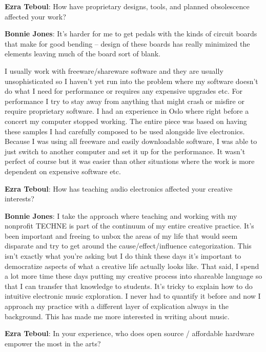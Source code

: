 \textbf{Ezra Teboul}: How have proprietary designs, tools, and planned obsolescence affected your work?

\textbf{Bonnie Jones}: It’s harder for me to get pedals with the kinds of circuit boards that make for good bending – design of these boards has really minimized the elements leaving much of the board sort of blank. 

I usually work with freeware/shareware software and they are usually unsophisticated so I haven’t yet run into the problem where my software doesn’t do what I need for performance or requires any expensive upgrades etc. For performance I try to stay away from anything that might crash or misfire or require proprietary software. I had an experience in Oslo where right before a concert my computer stopped working. The entire piece was based on having these samples I had carefully composed to be used alongside live electronics. Because I was using all freeware and easily downloadable software, I was able to just switch to another computer and set it up for the performance. It wasn’t perfect of course but it was easier than other situations where the work is more dependent on expensive software etc. 

\textbf{Ezra Teboul}: How has teaching audio electronics affected your creative interests?

\textbf{Bonnie Jones}: I take the approach where teaching and working with my nonprofit TECHNE is part of the continuum of my entire creative practice. It’s been important and freeing to unbox the areas of my life that would seem disparate and try to get around the cause/effect/influence categorization. This isn’t exactly what you’re asking but I do think these days it’s important to democratize aspects of what a creative life actually looks like. That said, I spend a lot more time these days putting my creative process into shareable language so that I can transfer that knowledge to students. It’s tricky to explain how to do intuitive electronic music exploration. I never had to quantify it before and now I approach my practice with a different layer of explication always in the background. This has made me more interested in writing about music. 

\textbf{Ezra Teboul}: In your experience, who does open source / affordable hardware empower the most in the arts?

